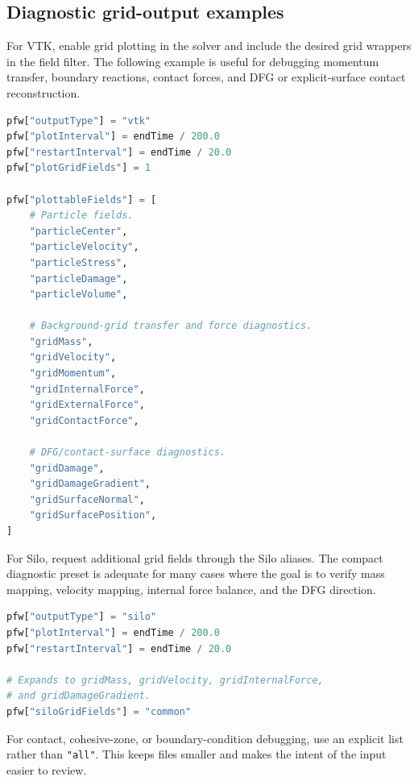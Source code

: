 \subsection{Diagnostic grid-output examples}
\label{sec:pfw-diagnostic-output-examples}

For VTK, enable grid plotting in the solver and include the desired grid wrappers in the field filter.  The following example is useful for debugging momentum transfer, boundary reactions, contact forces, and DFG or explicit-surface contact reconstruction.

\begin{lstlisting}[language=Python,caption={VTK output with selected particle and grid diagnostics.}]
pfw["outputType"] = "vtk"
pfw["plotInterval"] = endTime / 200.0
pfw["restartInterval"] = endTime / 20.0
pfw["plotGridFields"] = 1

pfw["plottableFields"] = [
    # Particle fields.
    "particleCenter",
    "particleVelocity",
    "particleStress",
    "particleDamage",
    "particleVolume",

    # Background-grid transfer and force diagnostics.
    "gridMass",
    "gridVelocity",
    "gridMomentum",
    "gridInternalForce",
    "gridExternalForce",
    "gridContactForce",

    # DFG/contact-surface diagnostics.
    "gridDamage",
    "gridDamageGradient",
    "gridSurfaceNormal",
    "gridSurfacePosition",
]
\end{lstlisting}

For Silo, request additional grid fields through the Silo aliases.  The compact diagnostic preset is adequate for many cases where the goal is to verify mass mapping, velocity mapping, internal force balance, and the DFG direction.

\begin{lstlisting}[language=Python,caption={Silo output with the common grid-diagnostic preset.}]
pfw["outputType"] = "silo"
pfw["plotInterval"] = endTime / 200.0
pfw["restartInterval"] = endTime / 20.0

# Expands to gridMass, gridVelocity, gridInternalForce,
# and gridDamageGradient.
pfw["siloGridFields"] = "common"
\end{lstlisting}

For contact, cohesive-zone, or boundary-condition debugging, use an explicit list rather than \texttt{"all"}.  This keeps files smaller and makes the intent of the input easier to review.

